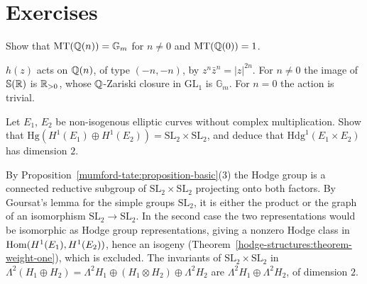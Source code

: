 \section{Exercises}\label{mumford-tate:section-exercises}

\begin{exercise}\label{mumford-tate:exercise-tate}
Show that $\mathrm{MT}(\mathbb{Q}(n)) = \mathbb{G}_m$ for $n \neq 0$ and $\mathrm{MT}(\mathbb{Q}(0)) = 1$.
\end{exercise}

\begin{solution}
$h(z)$ acts on $\mathbb{Q}(n)$, of type $(-n, -n)$, by $z^n\bar z^n = |z|^{2n}$. For $n \neq 0$ the image of $\mathbb{S}(\mathbb{R})$ is $\mathbb{R}_{>0}$, whose $\mathbb{Q}$-Zariski closure in $\mathrm{GL}_1$ is $\mathbb{G}_m$. For $n = 0$
the action is trivial.
\end{solution}

\begin{exercise}\label{mumford-tate:exercise-product-elliptic}
Let $E_1$, $E_2$ be non-isogenous elliptic curves without complex multiplication. Show that $\mathrm{Hg}(H^1(E_1) \oplus H^1(E_2)) = \mathrm{SL}_2 \times \mathrm{SL}_2$, and deduce that
$\mathrm{Hdg}^1(E_1 \times E_2)$ has dimension $2$.
\end{exercise}

\begin{solution}
By Proposition~\ref{mumford-tate:proposition-basic}(3) the Hodge group is a connected reductive subgroup of $\mathrm{SL}_2 \times \mathrm{SL}_2$ projecting onto both factors. By Goursat's lemma for the
simple groups $\mathrm{SL}_2$, it is either the product or the graph of an isomorphism $\mathrm{SL}_2 \to \mathrm{SL}_2$. In the second case the two representations would be isomorphic as Hodge
group representations, giving a nonzero Hodge class in $\operatorname{Hom}(H^1(E_1), H^1(E_2))$, hence an isogeny (Theorem~\ref{hodge-structures:theorem-weight-one}), which is excluded. The invariants of
$\mathrm{SL}_2 \times \mathrm{SL}_2$ in $\Lambda^2(H_1 \oplus H_2) = \Lambda^2H_1 \oplus (H_1 \otimes H_2) \oplus \Lambda^2H_2$ are $\Lambda^2H_1 \oplus \Lambda^2H_2$, of dimension $2$.
\end{solution}
